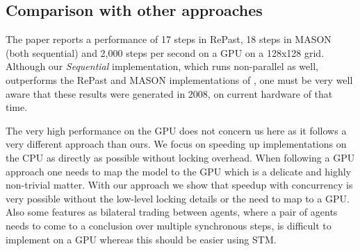 %

\subsection{Comparison with other approaches}
The paper \cite{lysenko_framework_2008} reports a performance of 17 steps in RePast, 18 steps in MASON (both sequential) and 2,000 steps per second on a GPU on a 128x128 grid. Although our \textit{Sequential} implementation, which runs non-parallel as well, outperforms the RePast and MASON implementations of \cite{lysenko_framework_2008}, one must be very well aware that these results were generated in 2008, on current hardware of that time.


The very high performance on the GPU does not concern us here as it follows a very different approach than ours. We focus on speeding up implementations on the CPU as directly as possible without locking overhead. When following a GPU approach one needs to map the model to the GPU which is a delicate and highly non-trivial matter. With our approach we show that speedup with concurrency is very possible without the low-level locking details or the need to map to a GPU. Also some features as bilateral trading between agents, where a pair of agents needs to come to a conclusion over multiple synchronous steps, is difficult to implement on a GPU whereas this should be easier using STM.


